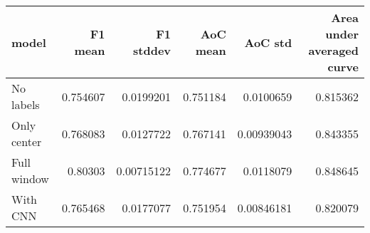 \begin{tabular}{lrrrrr}
\toprule
 model       &   F1 mean &   F1 stddev &   AoC mean &    AoC std &   Area under averaged curve \\
\midrule
 No labels   &  0.754607 &  0.0199201  &   0.751184 & 0.0100659  &                    0.815362 \\
 Only center &  0.768083 &  0.0127722  &   0.767141 & 0.00939043 &                    0.843355 \\
 Full window &  0.80303  &  0.00715122 &   0.774677 & 0.0118079  &                    0.848645 \\
 With CNN    &  0.765468 &  0.0177077  &   0.751954 & 0.00846181 &                    0.820079 \\
\bottomrule
\end{tabular}